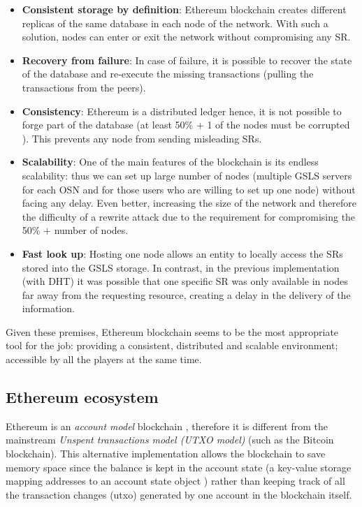 \begin{itemize}
  \item \textbf{Consistent storage by definition}: Ethereum blockchain creates different replicas of the same database in each node of the network. With such a solution, nodes can enter or exit the network without compromising any SR.
  \item \textbf{Recovery from failure}: In case of failure, it is possible to recover the state of the database and re-execute the missing transactions (pulling the transactions from the peers).
  \item \textbf{Consistency}: Ethereum is a distributed ledger hence, it is not possible to forge part of the database (at least 50\% + 1 of the nodes must be corrupted \cite{dennis_rep_2015}). This prevents any node from sending misleading SRs.
  \item \textbf{Scalability}: One of the main features of the blockchain is its endless scalability: thus we can set up large number of nodes (multiple GSLS servers for each OSN and for those users who are willing to set up one node) without facing any delay.
  Even better, increasing the size of the network and therefore the difficulty of a rewrite attack due to the requirement for compromising the 50\% + number of nodes.
  \item \textbf{Fast look up}: Hosting one node allows an entity to locally access the SRs stored into the GSLS storage. In contrast, in the previous implementation (with DHT) it was possible that one specific SR was only available in nodes far away from the requesting resource, creating a delay in the delivery of the information. 
\end{itemize}

Given these premises, Ethereum blockchain seems to be the most appropriate tool for the job: providing a consistent, distributed and scalable environment; accessible by all the players at the same time.


\subsection{Ethereum ecosystem}
\label{ethereumEcosystem:1}

Ethereum is an \textit{account model} blockchain \cite{wood_ethereum_2014}, therefore it is different from the mainstream \textit{Unspent transactions model (UTXO model)}  (such as the Bitcoin blockchain). This alternative implementation allows the blockchain to save memory space since the balance is kept in the account state (a key-value storage mapping addresses to an account state object \cite{ethereum_yellowpaper}) rather than keeping track of all the transaction changes (utxo) generated by one account in the blockchain itself.

